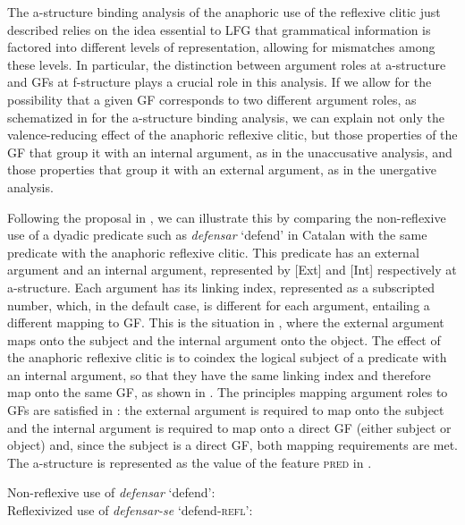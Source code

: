 \documentclass[output=paper,hidelinks]{langscibook}
\begin{document}
The a-structure binding analysis of the anaphoric use of the reflexive clitic just described relies on the idea essential to LFG that grammatical information is factored into different levels of representation, allowing for mismatches among these levels. In particular, the distinction between argument roles at a-structure and GFs at f-structure plays a crucial role in this analysis. If we allow for the possibility that a given GF corresponds to two different argument roles, as schematized in  for the a-structure binding analysis, we can explain not only the valence-reducing effect of the anaphoric reflexive clitic, but those properties of the GF that group it with an internal argument, as in the unaccusative analysis, and those properties that group it with an external argument, as in the unergative analysis. 

Following the proposal in \citet{alsina1996the-role}, we can illustrate this by comparing the non-reflexive use of a dyadic predicate such as \textit{defensar} `defend' in Catalan with the same predicate with the anaphoric reflexive clitic. This predicate has an external argument and an internal argument, represented by [Ext] and [Int] respectively at a-structure. Each argument has its linking index, represented as a subscripted number, which, in the default case, is different for each argument, entailing a different mapping to GF. This is the situation in , where the external argument maps onto the subject and the internal argument onto the object. The effect of the anaphoric reflexive clitic is to coindex the logical subject of a predicate with an internal argument, so that they have the same linking index and therefore map onto the same GF, as shown in . The principles mapping argument roles to GFs are satisfied in : the external argument is required to map onto the subject and the internal argument is required to map onto a direct GF (either subject or object) and, since the subject is a direct GF, both mapping requirements are met. The a-structure is represented as the value of the feature \textsc{pred} in .

\ea\label{ex:Romance:34}
\ea\label{ex:Romance:34a}
Non-reflexive use of \textit{defensar} `defend':\\
\ex\label{ex:Romance:34b}
Reflexivized use of \textit{defensar-se} `defend-\textsc{refl}':\\
\z\z
  
\end{document}
